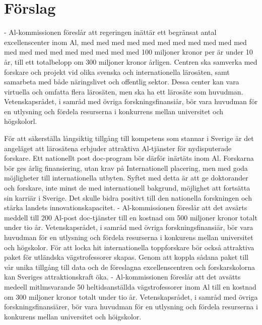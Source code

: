 {{{{{{{{\section*{Förslag}
- Al-kommissionen föreslår att regeringen inättär ett begränsat antal excellenscenter inom Al, med med med med med med med med med med med med med med med med med med med med
100 miljoner kronor per är under 10 år, till ett totalbelopp om 300 miljoner kronor årligen. Centren ska samverka med forskare och projekt vid olika svenska och internationella lärosäten, samt samarbeta med både näringslivet och offentlig sektor. Dessa center kan vara virtuella och omfatta flera lärosäten, men ska ha ett lärosäte som huvudman. Vetenskapsrådet, i samråd med övriga forskningsfinansiår, bör vara huvudman för en utlysning och fördela resurserna i konkurrens mellan universitet och högskolorl.

För att säkerställa långsiktig tillgång till kompetens som stannar i Sverige är det angeläget att lärosätena erbjuder attraktiva Al-tjänster för nydisputerade forskare. Ett nationellt post doc-program bör därför inärtäts inom Al. Forskarna bör ges årlig finansiering, utan krav på Internationell placering, men med goda möjligheter till internationella utbyten. Syftet med detta är att ge doktorander och forskare, inte minst de med internationell bakgrund, möjlighet att fortsätta sin karriär i Sverige. Det skulle bidra positivt till den nationella forskningen och stärka landets innovationskapacitet.
- Al-kommissionen föreslår att det avsärts meddell till 200 Al-post doc-tjänster till en kostnad om 500 miljoner kronor totalt under tio år. Vetenskapsrådet, i samråd med övriga forskningsfinansiär, bör vara huvudman för en
utlysning och fördela resurserna i konkurens mellan universitet och högskolor.
För att locka hit internationella toppforskare bör också attraktiva paket för utländska vägstrofessorer skapas. Genom att koppla sådana paket till vår unika tillgång till data och de föreslagna excellenscentren och forskarskolorna kan Sveriges attraktionskraft öka.
- Al-kommissionen föreslår att det avsätts medeell mitlmsvarande 50 heltidsanställda vägstrofessorer inom Al till en kostnad om 300 miljoner kronor totalt under tio år. Vetenskapsrådet, i samråd med övriga forskningsfinansiärer, bör vara huvudman för en utlysning och fördela resurserna i konkurens mellan universitet och höigskolor.
}}}}}}}}
